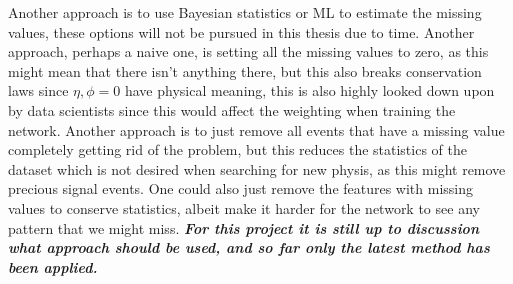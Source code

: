 \documentclass[14pt, a4paper]{book}
\begin{document}
Another approach is to use Bayesian statistics or ML to estimate the missing values, these options will not be pursued in this thesis due to time. 
Another approach, perhaps a naive one, is setting all the missing values to zero, as this might mean that there isn't anything there, but this also breaks conservation laws since $\eta,\phi=0$ have physical meaning, this is also highly looked down upon by data scientists since this would affect the weighting when training the network. 
Another approach is to just remove all events that have a missing value completely getting rid of the problem, but this reduces the statistics of the dataset which is not desired when searching for new physis, as this might remove precious signal events.
One could also just remove the features with missing values to conserve statistics, albeit make it harder for the network to see any pattern that we might miss. \textit{\textbf{For this project it is still up to discussion what approach should be used, and so far only the latest method has been applied.}}\\
\end{document}
